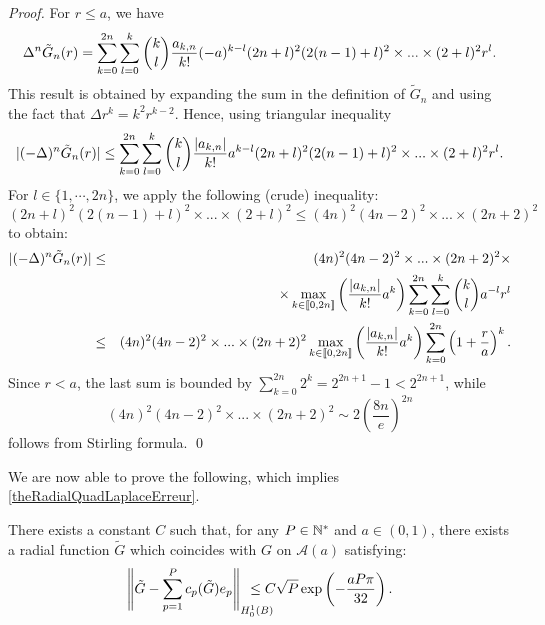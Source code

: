 \documentclass[smallextended]{svjour3}
\begin{document}
\begin{proof} For $r \leq a$, we have
	\[\Delta^n \tilde{G}_n(r) = \sum_{k=0}^{2n}\sum_{l=0}^k \dbinom{k}{l}\dfrac{a_{k,n}}{k!}(-a)^{k-l}(2n+l)^2 (2(n-1)+l)^2\times ... \times (2+l)^2 r^{l}.\]
	This result is obtained by expanding the sum in the definition of $\tilde{G}_n$ and using the fact that $\Delta r^k = k^2r^{k-2}$. Hence, using triangular inequality
	\[|(-\Delta)^n \tilde{G}_n(r)| \leq \sum_{k=0}^{2n}\sum_{l=0}^k \dbinom{k}{l}\dfrac{|a_{k,n}|}{k!}a^{k-l}(2n+l)^2(2(n-1)+l)^2\times ... \times (2+l)^2r^{l}.\]	
	For $l\in \{1,\cdots,2n\}$, we apply the following (crude) inequality:
	\begin{equation}
		(2n+l)^2(2(n-1)+l)^2\times ... \times (2+l)^2 \leq (4n)^2(4n-2)^2 \times ... \times (2n+2)^2
		\label{estimationTresGrossiere}
	\end{equation}
	to obtain: 
	\begin{eqnarray*}		
		|(-\Delta)^n \tilde{G}_n(r)| &\leq& (4n)^2(4n-2)^2 \times ... \times (2n+2)^2\times\\
		&&\times\max_{k\in\llbracket 0,2n\rrbracket}\left(\dfrac{|a_{k,n}|}{k!}a^k\right)\sum_{k=0}^{2n}\sum_{l=0}^k \dbinom{k}{l}a^{-l}r^l\\
		&\leq& (4n)^2(4n-2)^2 \times ... \times (2n+2)^2\max_{k\in\llbracket 0,2n\rrbracket}\left(\dfrac{|a_{k,n}|}{k!}a^k\right)\sum_{k=0}^{2n}\left(1+\frac{r}{a}\right)^k.		
	\end{eqnarray*}
	Since $r<a$, the last sum is bounded by $\displaystyle\sum_{k=0}^{2n}2^k = 2^{2n+1}-1 < 2^{2n+1}$,
	while 
	\[(4n)^2(4n-2)^2\times...\times (2n+2)^2 \sim 2\left(\dfrac{8n}{e}\right)^{2n}\]
	follows from Stirling formula. 
	\qed
\end{proof}
We are now able to prove the following, which implies \autoref{theRadialQuadLaplaceErreur}.
\begin{theorem}
	\label{The:DecroissanceErreurProlongementPoly}
	There exists a constant $C$ such that, for any $P \in \mathbb{N}^*$ and $a \in (0,1)$, there exists a radial function $\tilde{G}$ which coincides with $G$ on $\mathcal{A}(a)$ satisfying:
	\[\norm{\tilde{G} - \sum_{p=1}^{P}c_p(\tilde{G})e_p}_{H^1_0(B)} \hspace{-0.7cm}\leq C \sqrt{P} \exp\left(-\frac{aP\pi}{32}\right).\]
							
\end{theorem}
\end{document}
